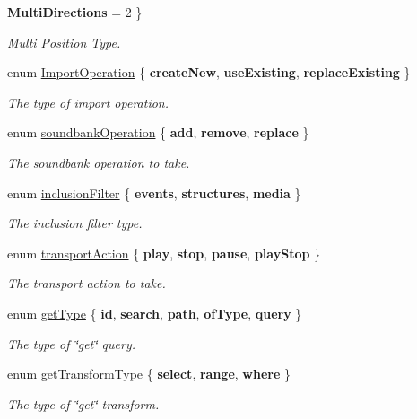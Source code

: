 \begin{DoxyCompactItemize}
{\bfseries Multi\+Directions} = 2
 \}
\begin{DoxyCompactList}\small\item\em Multi Position Type. \end{DoxyCompactList}\item 
enum \mbox{\hyperlink{class_waapi_c_s_1_1_custom_values_1_1_wwise_values_aab6588a021852b8a475ad5b07f43d1e9}{Import\+Operation}} \{ {\bfseries create\+New}, 
{\bfseries use\+Existing}, 
{\bfseries replace\+Existing}
 \}
\begin{DoxyCompactList}\small\item\em The type of import operation. \end{DoxyCompactList}\item 
enum \mbox{\hyperlink{class_waapi_c_s_1_1_custom_values_1_1_wwise_values_a1b0c0844c7d8ac428022c97feeec0b5f}{soundbank\+Operation}} \{ {\bfseries add}, 
{\bfseries remove}, 
{\bfseries replace}
 \}
\begin{DoxyCompactList}\small\item\em The soundbank operation to take. \end{DoxyCompactList}\item 
enum \mbox{\hyperlink{class_waapi_c_s_1_1_custom_values_1_1_wwise_values_a485191067ed69983f435631f759b6c93}{inclusion\+Filter}} \{ {\bfseries events}, 
{\bfseries structures}, 
{\bfseries media}
 \}
\begin{DoxyCompactList}\small\item\em The inclusion filter type. \end{DoxyCompactList}\item 
enum \mbox{\hyperlink{class_waapi_c_s_1_1_custom_values_1_1_wwise_values_abe08eb4038ce656dcf1f451b78a35983}{transport\+Action}} \{ {\bfseries play}, 
{\bfseries stop}, 
{\bfseries pause}, 
{\bfseries play\+Stop}
 \}
\begin{DoxyCompactList}\small\item\em The transport action to take. \end{DoxyCompactList}\item 
enum \mbox{\hyperlink{class_waapi_c_s_1_1_custom_values_1_1_wwise_values_a965953df32cac96b44c500990fcfd5d2}{get\+Type}} \{ \newline
{\bfseries id}, 
{\bfseries search}, 
{\bfseries path}, 
{\bfseries of\+Type}, 
\newline
{\bfseries query}
 \}
\begin{DoxyCompactList}\small\item\em The type of \char`\"{}get\char`\"{} query. \end{DoxyCompactList}\item 
enum \mbox{\hyperlink{class_waapi_c_s_1_1_custom_values_1_1_wwise_values_aa760e1a314fbb9fa38c1f8abd6267b16}{get\+Transform\+Type}} \{ {\bfseries select}, 
{\bfseries range}, 
{\bfseries where}
 \}
\begin{DoxyCompactList}\small\item\em The type of \char`\"{}get\char`\"{} transform. \end{DoxyCompactList}\end{DoxyCompactItemize}


